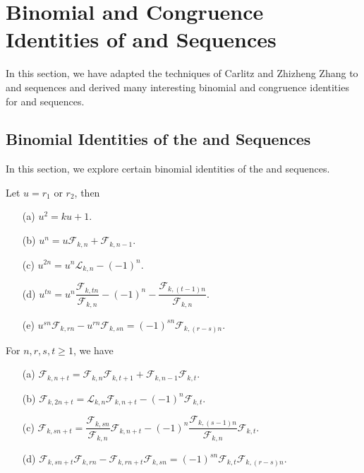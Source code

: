  \section{Binomial and Congruence Identities of \kF \vspace{0mm} and \kL \vspace{0mm} Sequences}
\noindent In this section, we have adapted the techniques of Carlitz\cite{2} and Zhizheng Zhang\cite{3} to \kF\vspace{0mm}  and \kL\vspace{0mm}  sequences and derived many interesting  binomial and congruence identities for \kF\vspace{0mm}  and \kL\vspace{0mm}  sequences.
\subsection{{Binomial Identities of the \kF\vspace{0mm} and \kL\vspace{0mm} Sequences}}
In this section, we explore certain binomial identities of the \kF\vspace{0mm} and \kL\vspace{0mm} sequences. 
\begin{lemma}
Let $u=r_{1}$ or $r_{2}$, then\label{3.1}
\begin{enumerate}
\item[(a)] $u^2=ku+1$.
\item[(b)] $u^n=u\mathcal{F}_{k,n}+\mathcal{F}_{k,n-1}$.
\item[(c)] $u^{2n}=u^n\mathcal{L}_{k,n}-(-1)^n$.
\item[(d)] $u^{tn}=u^n\dfrac{\mathcal{F}_{k,tn}}{\mathcal{F}_{k,n}}-(-1)^n-\dfrac{\mathcal{F}_{k,(t-1)n}}{\mathcal{F}_{k,n}}$.
\item[(e)] $u^{sn}\mathcal{F}_{k,rn}-u^{rn}\mathcal{F}_{k,sn}=(-1)^{sn}\mathcal{F}_{k,(r-s)n}$.
\end{enumerate}
\end{lemma}
\begin{theorem}For $n, r, s, t\geq 1$, we have\label{3.2}
\begin{enumerate}
\item[(a)] $\mathcal{F}_{k,n+t}=\mathcal{F}_{k,n}\mathcal{F}_{k,t+1}+\mathcal{F}_{k,n-1}\mathcal{F}_{k,t}$.
\item[(b)] $\mathcal{F}_{k,2n+t}=\mathcal{L}_{k,n}\mathcal{F}_{k,n+t}-(-1)^n\mathcal{F}_{k,t}$.
\item[(c)] $\mathcal{F}_{k,sn+t}=\dfrac{\mathcal{F}_{k,sn}}{\mathcal{F}_{k,n}}\mathcal{F}_{k,n+t}-(-1)^n\dfrac{\mathcal{F}_{k,(s-1)n}}{\mathcal{F}_{k,n}}\mathcal{F}_{k,t}$. 
\item[(d)] $\mathcal{F}_{k,sn+t}\mathcal{F}_{k,rn}-\mathcal{F}_{k,rn+t}\mathcal{F}_{k,sn}=(-1)^{sn}\mathcal{F}_{k,t}\mathcal{F}_{k,(r-s)n}$.
\end{enumerate}
\end{theorem}
